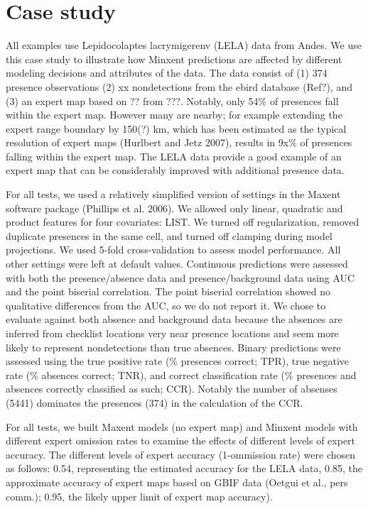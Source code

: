 \section{Case study}
\label{sec:lela} 

All examples use Lepidocolaptes lacrymigerenv (LELA) data from Andes. We use this case study to illustrate how Minxent predictions are affected by different modeling decisions and attributes of the data. The data consist of (1) 374 presence observations (2) xx nondetections from the ebird database (Ref?), and (3) an expert map based on ?? from ???. Notably, only 54\% of presences fall within the expert map. However many are nearby; for example extending the expert range boundary by 150(?) km, which has been estimated as the typical resolution of expert maps (Hurlbert and Jetz 2007), results in 9x\% of presences falling within the expert map. The LELA data provide a good example of an expert map that can be considerably improved with additional presence data. 


For all tests, we used a relatively simplified version of settings in the Maxent software package (Phillips et al. 2006). We allowed only linear, quadratic and product features for four covariates: LIST. We turned off regularization, removed duplicate presences in the same cell, and turned off clamping during model projections. We used 5-fold cross-validation to assess model performance. All other settings were left at default values. Continuous predictions were assessed with both the presence/absence data and presence/background data using AUC and the point biserial correlation. The point biserial correlation showed no qualitative differences from the AUC, so we do not report it. We chose to evaluate against both absence and background data because the absences are inferred from checklist locations very near presence locations and seem more likely to represent nondetections than true absences. Binary predictions were assessed using the true positive rate (\% presences correct; TPR), true negative rate (\% absences correct; TNR), and correct classification rate (\% presences and absences correctly classified as such; CCR). Notably the number of absenses (5441) dominates the presences (374) in the calculation of the CCR.


For all tests, we built Maxent models (no expert map) and Minxent models with different expert omission rates to examine the effects of different levels of expert accuracy. The different levels of expert accuracy (1-ommission rate) were chosen as follows: 0.54, representing the estimated accuracy for the LELA data, 0.85, the approximate accuracy of expert maps based on GBIF data (Oetgui et al., pers comm.); 0.95, the likely upper limit of expert map accuracy). 



